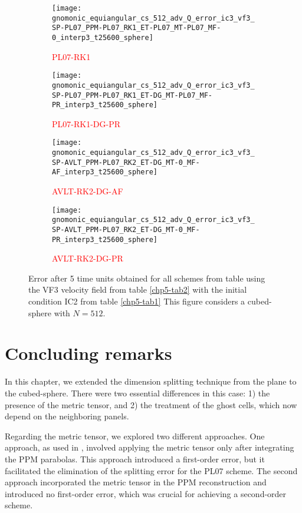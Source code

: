 \begin{figure}[!htb]
	\centering
	\begin{subfigure}{0.35\textwidth}
		\centering
		\texttt{[image: gnomonic\_equiangular\_cs\_512\_adv\_Q\_error\_ic3\_vf3\_SP-PL07\_PPM-PL07\_RK1\_ET-PL07\_MT-PL07\_MF-0\_interp3\_t25600\_sphere]}
		\caption{\textcolor{red}{PL07-RK1} \label{chp5-adv4-s1}}
	\end{subfigure}
	\begin{subfigure}{0.35\textwidth}
		\centering
		\texttt{[image: gnomonic\_equiangular\_cs\_512\_adv\_Q\_error\_ic3\_vf3\_SP-PL07\_PPM-PL07\_RK1\_ET-DG\_MT-PL07\_MF-PR\_interp3\_t25600\_sphere]}
		\caption{\textcolor{red}{PL07-RK1-DG-PR} \label{chp5-adv4-s2}}
	\end{subfigure}
	
	\begin{subfigure}{0.35\textwidth}
		\centering
		\texttt{[image: gnomonic\_equiangular\_cs\_512\_adv\_Q\_error\_ic3\_vf3\_SP-AVLT\_PPM-PL07\_RK2\_ET-DG\_MT-0\_MF-AF\_interp3\_t25600\_sphere]}
		\caption{\textcolor{red}{AVLT-RK2-DG-AF} \label{chp5-adv4-s3}}
	\end{subfigure}
	\begin{subfigure}{0.35\textwidth}
		\centering
		\texttt{[image: gnomonic\_equiangular\_cs\_512\_adv\_Q\_error\_ic3\_vf3\_SP-AVLT\_PPM-PL07\_RK2\_ET-DG\_MT-0\_MF-PR\_interp3\_t25600\_sphere]}
		\caption{\textcolor{red}{AVLT-RK2-DG-PR} \label{chp5-adv4-s4}}
	\end{subfigure}
	\caption{ Error after 5 time units obtained for all schemes from table using the VF3 velocity field from table \ref{chp5-tab2} with the initial condition IC2 from  table \ref{chp5-tab1} 
		This figure considers a cubed-sphere with $N=512$. \label{chp5-adv4}}
\end{figure}



\section{Concluding remarks}
\label{chp-cs-conc}
In this chapter, we extended the dimension splitting technique from the plane to the 
cubed-sphere. There were two essential differences in this case: 1) the presence of the 
metric tensor, and 2) the treatment of the ghost cells, which now depend on the neighboring 
panels.

Regarding the metric tensor, we explored two different approaches. One approach, as used in 
\citet{putman:2007}, involved applying the metric tensor only after integrating the PPM parabolas. 
This approach introduced a first-order error, but it facilitated the elimination of the 
splitting error for the PL07 scheme. The second approach incorporated the metric tensor in 
the PPM reconstruction and introduced no first-order error, which was crucial for achieving 
a second-order scheme.

